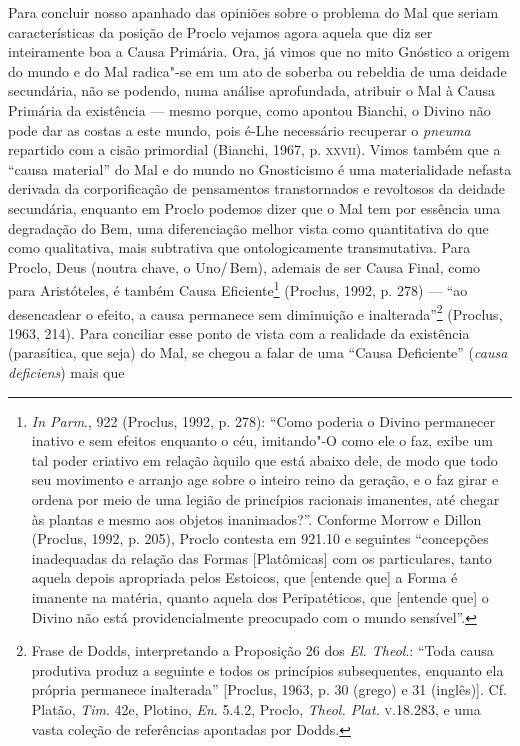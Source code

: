 Para concluir nosso apanhado das opiniões sobre o problema do Mal
que seriam características da posição de Proclo vejamos agora
aquela que diz ser inteiramente boa a Causa Primária. Ora, já
vimos que no mito Gnóstico a origem do mundo e do Mal radica"-se
em um ato de soberba ou rebeldia de uma deidade secundária, não
se podendo, numa análise aprofundada, atribuir o Mal à Causa
Primária da existência --- mesmo porque, como apontou Bianchi, o
Divino não pode dar as costas a este mundo, pois é-Lhe
necessário recuperar o \emph{pneuma} repartido com a cisão
primordial (Bianchi, 1967, p. \textsc{xxvii}). Vimos também que a “causa
material” do Mal e do mundo no Gnosticismo é uma materialidade
nefasta derivada da corporificação de pensamentos transtornados
e revoltosos da deidade secundária, enquanto em Proclo podemos
dizer que o Mal tem por essência uma degradação do Bem, uma
diferenciação melhor vista como quantitativa do que como
qualitativa, mais subtrativa que ontologicamente transmutativa.
Para Proclo, Deus (noutra chave, o Uno/\,Bem), ademais de ser
Causa Final, como para Aristóteles, é também Causa
Eficiente\footnote{ \emph{In Parm}., 922 (Proclus, 1992, p.
278): “Como poderia o Divino permanecer inativo e sem efeitos
enquanto o céu, imitando"-O como ele o faz, exibe um tal poder
criativo em relação àquilo que está abaixo dele, de modo que
todo seu movimento e arranjo age sobre o inteiro reino da
geração, e o faz girar e ordena por meio de uma legião de
princípios racionais imanentes, até chegar às plantas e mesmo
aos objetos inanimados?”. Conforme Morrow e Dillon (Proclus,
1992, p. 205), Proclo contesta em 921.10 e seguintes “concepções
inadequadas da relação das Formas [Platômicas] com os
particulares, tanto aquela depois apropriada pelos Estoicos, que
[entende que] a Forma é imanente na matéria, quanto aquela dos
Peripatéticos, que [entende que] o Divino não está
providencialmente preocupado com o mundo sensível”.} (Proclus,
1992, p. 278) --- “ao desencadear o efeito, a causa permanece sem
diminuição e inalterada”\footnote{ Frase de Dodds, interpretando
a Proposição 26 dos \emph{El. Theol}.: “Toda causa produtiva
produz a seguinte e todos os princípios subsequentes, enquanto
ela própria permanece inalterada” [Proclus, 1963, p. 30 (grego)
e 31 (inglês)]. Cf. Platão, \emph{Tim}. 42e, Plotino,
\emph{En}. 5.4.2, Proclo, \emph{Theol. Plat.} \textsc{v}.18.283, e
uma vasta coleção de referências apontadas por Dodds.} (Proclus,
1963, 214). Para conciliar esse ponto de vista com a realidade
da existência (parasítica, que seja) do Mal, se chegou a falar
de uma “Causa Deficiente” (\emph{causa deficiens}) mais que
